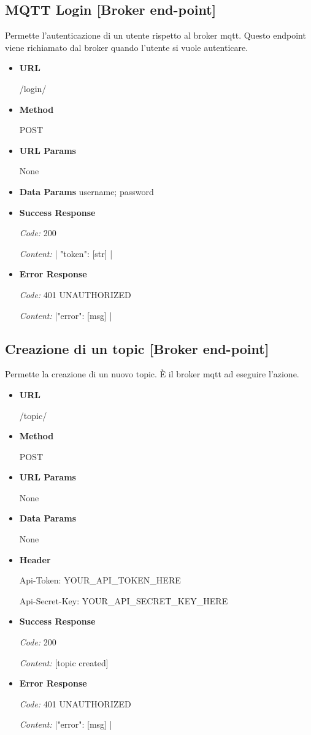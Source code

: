 \subsection{MQTT Login [Broker end-point]}
Permette l'autenticazione di un utente rispetto al broker mqtt. Questo endpoint viene richiamato dal broker quando l'utente si vuole autenticare.
\begin{itemize}
\item \textbf{URL} \par
    /login/
\item \textbf{Method} \par
    POST
\item \textbf{URL Params} \par
    None
\item \textbf{Data Params}
    username; password
\item \textbf{Success Response} \par
    \emph{Code:} 200 \par
    \emph{Content:} | {"token": [str]} |
\item \textbf{Error Response} \par
    \emph{Code:} 401 UNAUTHORIZED \par
    \emph{Content:} |{"error": [msg] }|
\end{itemize}


\subsection{Creazione di un topic [Broker end-point]}
Permette la creazione di un nuovo topic.
È il broker mqtt ad eseguire l'azione.
\begin{itemize}
\item \textbf{URL} \par
    /topic/
\item \textbf{Method} \par
    POST
\item \textbf{URL Params} \par
    None
\item \textbf{Data Params} \par
    None
\item \textbf{Header} \par
     Api-Token: YOUR\_API\_TOKEN\_HERE \par
     Api-Secret-Key: YOUR\_API\_SECRET\_KEY\_HERE
\item \textbf{Success Response} \par
    \emph{Code:} 200 \par
    \emph{Content:} [topic created]
\item \textbf{Error Response} \par
    \emph{Code:} 401 UNAUTHORIZED \par
    \emph{Content:} |{"error": [msg] }|
\end{itemize}

